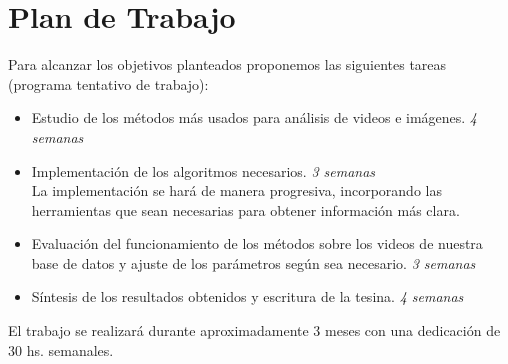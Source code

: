 \section{Plan de Trabajo}
\iffalse
Se recomienda estructurar esta sección en función de los objetivos específicos.
* Planteo de la hipotesis a analizar en cada objetivo o seccion del proyecto.
* Actividades propuestas y metodologıa a usar en cada una de ellas.
* Resultados que se esperan obtener o metas a cumplir y como se evaluaran
los resultados.
Trate de evaluar los potenciales problemas y limitaciones de la metodolog ́ıa
y t ́ecnicas propuestas y en lo posible proponer alternativas.
\fi

Para alcanzar los objetivos planteados proponemos las siguientes tareas (programa tentativo de trabajo):
\begin{itemize}
  \item Estudio de los métodos más usados para análisis de videos e imágenes. \textit{4 semanas}
  \item Implementación de los algoritmos necesarios. \textit{3 semanas}
    \\ La implementación se hará de manera progresiva, incorporando las herramientas que
    sean necesarias para obtener información más clara.
  \item Evaluación del funcionamiento de los métodos sobre los videos de nuestra base de datos y
  ajuste de los parámetros según sea necesario. \textit{3 semanas}
  \item Síntesis de los resultados obtenidos y escritura de la tesina. \textit{4 semanas}
\end{itemize}
El trabajo se realizará durante aproximadamente 3 meses con una dedicación de 30 hs. semanales.

